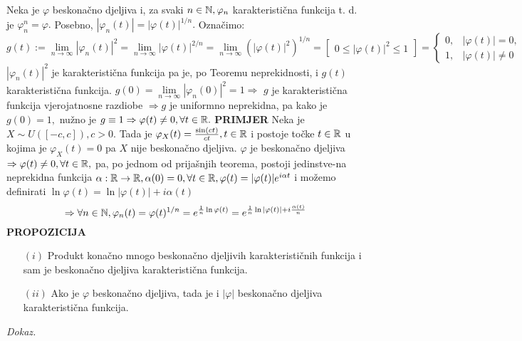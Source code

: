 \documentclass{article}
\begin{document}
Neka je \(\varphi\) beskonačno djeljiva i, za svaki \(n\in\Bbb N,\varphi_n\) karakteristična funkcija t. d. je \(\varphi_n^n=\varphi.\) Posebno, \(|\varphi_n(t)|=|\varphi(t)|^{1/n}.\) Označimo: \[g(t):=\lim_{n\to\infty}|\varphi_n(t)|^2=\lim_{n\to\infty}|\varphi(t)|^{2/n}=\lim_{n\to\infty}\left(|\varphi(t)|^2\right)^{1/n}=\begin{bmatrix}0\le |\varphi(t)|^2\le1\end{bmatrix}=\begin{cases}0,&|\varphi(t)|=0,\\1,&|\varphi(t)|\ne0\end{cases}\] \(|\varphi_n(t)|^2\) je karakteristična funkcija pa je, po Teoremu neprekidnosti, i \(g(t)\) karakteristična funkcija. \(g(0)=\lim\limits_{n\to\infty}|\varphi_n(0)|^2=1\Rightarrow\) \(g\) je karakteristična funkcija vjerojatnosne razdiobe \(\Rightarrow g\) je uniformno neprekidna, pa kako je \(g(0)=1,\) nužno je \(g\equiv1\Rightarrow \varphi(t)\ne0,\forall t\in\Bbb R.\)\newline\newline
\textbf{PRIMJER}\newline
Neka je \(X\sim U\left([-c,c]\right),c>0.\) Tada je \(\varphi_X(t)=\frac{\sin(ct)}{ct},t\in\Bbb R\) i postoje točke \(t\in\Bbb R\) u kojima je \(\varphi_X(t)=0\) pa \(X\) nije beskonačno djeljiva.\newline\newline
\(\varphi\) je beskonačno djeljiva \(\Rightarrow\varphi(t)\ne0,\forall t\in\Bbb R,\) pa, po jednom od prijašnjih teorema, postoji jedinstve-\newline na neprekidna funkcija \(\alpha:\Bbb R\to\Bbb R,\alpha(0)=0,\forall t\in\Bbb R,\varphi(t)=|\varphi(t)|e^{i\alpha t}\) i možemo definirati \(\ln\varphi(t)=\ln|\varphi(t)|+i\alpha(t)\) \[\Rightarrow\forall n\in\Bbb N,\varphi_n(t)=\varphi(t)^{1/n}=e^{\frac1n\ln\varphi(t)}=e^{\frac1n\ln|\varphi(t)|+i\frac{\alpha(t)}n}\]
\textbf{PROPOZICIJA}
\begin{enumerate}
    \item[\((i)\)] Produkt konačno mnogo beskonačno djeljivih karakterističnih funkcija i sam je beskonačno djeljiva karakteristična funkcija.
    \item[\((ii)\)] Ako je \(\varphi\) beskonačno djeljiva, tada je i \(|\varphi|\) beskonačno djeljiva karakteristična funkcija.
\end{enumerate}
\textit{Dokaz.}
\end{document}
